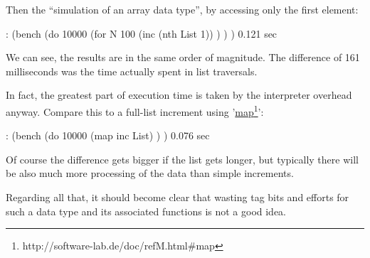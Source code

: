 Then the ``simulation of an array data type'', by accessing only the first
element:
\begin{wideverbatim}
   : (bench
      (do 10000
         (for N 100
            (inc (nth List 1)) ) ) )
   0.121 sec
\end{wideverbatim}


We can see, the results are in the same order of magnitude. The difference of
161 milliseconds was the time actually spent in list traversals.

In fact, the greatest part of execution time is taken by the interpreter
overhead anyway. Compare this to a full-list increment using
'\underline{map}\footnote{http://software-lab.de/doc/refM.html\#map}':
\begin{wideverbatim}
   : (bench
      (do 10000
         (map inc List) ) )
   0.076 sec
\end{wideverbatim}

Of course the difference gets bigger if the list gets longer, but typically
there will be also much more processing of the data than simple increments.

Regarding all that, it should become clear that wasting tag bits and efforts for
such a data type and its associated functions is not a good idea.
